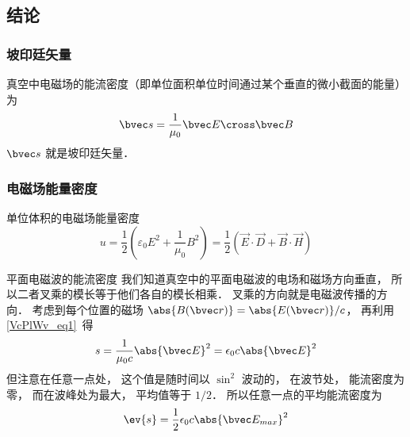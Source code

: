 



\subsection{结论}

\subsubsection{坡印廷矢量}
真空中电磁场的能流密度（即单位面积单位时间通过某个垂直的微小截面的能量）为 %
\begin{equation}
\bvec s = \frac{1}{\mu_0} \bvec E \cross \bvec B
\end{equation} 
$\bvec s$ 就是坡印廷矢量．

\subsubsection{电磁场能量密度}
单位体积的电磁场能量密度\cite{GriffE}
\begin{equation}
u=\frac{1}{2}(\varepsilon_0 E^2+ \frac{1}{\mu_0} B^2)=\frac{1}{2} (\vec E \cdot \vec D + \vec B \cdot \vec H)
\end{equation} 

\begin{example}{平面电磁波的能流密度}\label{EBS_ex1}
我们知道真空中的平面电磁波的电场和磁场方向垂直， 所以二者叉乘的模长等于他们各自的模长相乘． 叉乘的方向就是电磁波传播的方向． 考虑到每个位置的磁场 $\abs{B(\bvec r)} = \abs{E(\bvec r)}/c$， 再利用\autoref{VcPlWv_eq1}~得
\begin{equation}
s = \frac{1}{\mu_0 c} \abs{\bvec E}^2 = \epsilon_0 c \abs{\bvec E}^2
\end{equation}
但注意在任意一点处， 这个值是随时间以 $\sin^2$ 波动的， 在波节处， 能流密度为零， 而在波峰处为最大， 平均值等于 $1/2$． %
所以任意一点的平均能流密度为
\begin{equation}
\ev{s} = \frac{1}{2} \epsilon_0 c \abs{\bvec E_{max}}^2
\end{equation}
\end{example}

